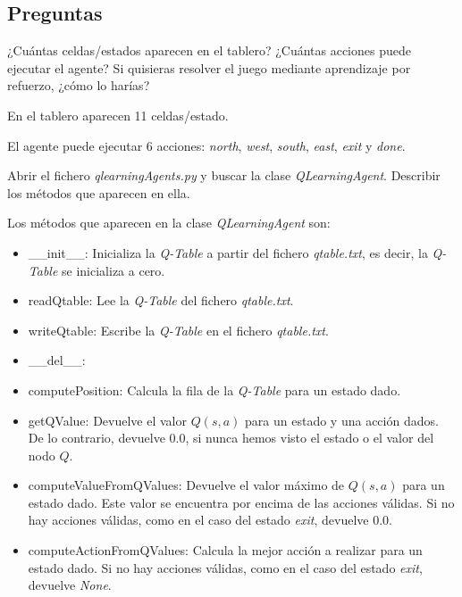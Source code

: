 \documentclass[11pt]{exam}
\begin{document}
\subsection*{Preguntas}

\begin{questions}
	
{ \question ¿Cuántas celdas/estados aparecen en el tablero? ¿Cuántas acciones puede ejecutar el agente? Si quisieras resolver el juego mediante aprendizaje por refuerzo, ¿cómo lo harías? 
}

En el tablero aparecen 11 celdas/estado.

El agente puede ejecutar 6 acciones: \textit{north}, \textit{west}, \textit{south}, \textit{east}, \textit{exit} y \textit{done}.

{ \question Abrir el fichero \textit{qlearningAgents.py} y buscar la clase \textit{QLearningAgent}. Describir los métodos que aparecen en ella.
}

Los métodos que aparecen en la clase \textit{QLearningAgent} son:

\begin{itemize}
	\item \_\_init\_\_: Inicializa la \textit{Q-Table} a partir del fichero \textit{qtable.txt}, es decir, la \textit{Q-Table} se inicializa a cero.
	
	\item readQtable: Lee la \textit{Q-Table} del fichero \textit{qtable.txt}.
	
	\item writeQtable: Escribe la \textit{Q-Table} en el fichero \textit{qtable.txt}.
	
	\item \_\_del\_\_:
	
	\item computePosition: Calcula la fila de la \textit{Q-Table} para un estado dado.
	
	\item getQValue: Devuelve el valor $Q(s,a)$ para un estado y una acción dados. De lo contrario, devuelve 0.0, si nunca hemos visto el estado o el valor del nodo $Q$.
	
	\item computeValueFromQValues: Devuelve el valor máximo de $Q(s,a)$ para un estado dado. Este valor se encuentra por encima de las acciones válidas. Si no hay acciones válidas, como en el caso del estado \textit{exit}, devuelve 0.0.
	
	\item computeActionFromQValues: Calcula la mejor acción a realizar para un estado dado. Si no hay acciones válidas, como en el caso del estado \textit{exit}, devuelve \textit{None}.
	

\end{itemize}
\end{questions}
\end{document}
